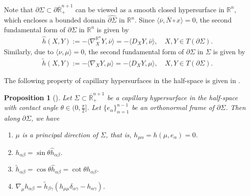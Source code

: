 \documentclass[11pt,reqno]{amsart}
\newtheorem{prop}[thm]{Proposition}
\theoremstyle{definition}
\theoremstyle{remark}
\newtheorem{rem}{Remark}
\numberwithin{equation}{section}
\renewcommand{\(}{\left(}
\renewcommand{\)}{\right)}
\renewcommand{\-}{\overline}
\renewcommand{\a}{\alpha}
\renewcommand{\b}{\beta}
\newcommand{\g}{\gamma}
\renewcommand{\d}{\delta}
\renewcommand{\t}{\theta}
\begin{document}
Note that $\partial \Sigma\subset \partial \-{\mathbb R}^{n+1}_{+}$ can be viewed as a smooth closed hypersurface in $\mathbb R^n$, which encloses a bounded domain $\widehat{\partial \Sigma}$ in $\mathbb R^n$. Since $\langle \-\nu, \-N\circ x\rangle=0$, the second fundamental form of $\partial \Sigma$ in $\mathbb R^n$ is given by
\begin{align*}
\widehat{h}(X,Y):=-\langle \nabla^{\mathbb R^n}_{X}Y,\-\nu\rangle=-\langle D_XY,\bar{\nu}\rangle, \quad X,Y\in T(\partial \Sigma).
\end{align*}
Similarly, due to $\langle \nu,\mu\rangle=0$, the second fundamental form of $\partial\Sigma$ in $\Sigma$ is given by
\begin{align*}
\tilde{h}(X,Y):=-\langle \nabla_{X}Y,\mu\rangle=-\langle D_XY,\mu\rangle, \quad X,Y\in T(\partial \Sigma).
\end{align*}

The following property of capillary hypersurfaces in the half-space is given in \cite[Proposition 2.3]{Wang-Weng-Xia2022}.
\begin{prop}[\cite{Wang-Weng-Xia2022}]\label{s2:prop-second-fundamental-form}
	Let $\Sigma\subset \-{\mathbb R}^{n+1}_{+}$ be a capillary hypersurface in the half-space with contact angle $\t\in(0,\frac{\pi}{2}]$. Let $\{e_\a\}_{\a=1}^{n-1}$ be an orthonormal frame of $\partial \Sigma$. Then along $\partial \Sigma$, we have
	\begin{enumerate}[(1)]
		\item $\mu$ is a principal direction of $\Sigma$, that is, $h_{\mu\a}=h(\mu,e_\a)=0$.
	    \item $h_{\a\b}=\sin \t \widehat{h}_{\a\b}$.
	    \item $\tilde{h}_{\a\b}=\cos\t \widehat{h}_{\a\b}=\cot\t h_{\a\b}$.
	    \item $\nabla_\mu h_{\a\b}=\tilde{h}_{\b\g}(h_{\mu\mu}\d_{\a\g}-h_{\a\g})$.
	\end{enumerate}
\end{prop}
\end{document}
